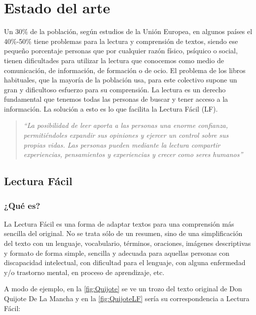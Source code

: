 \chapter{Estado del arte}
\label{cap:estadoDeLaCuestion}

Un 30\% de la población, según estudios de la Unión Europea, en algunos países el 40\%-50\% tiene problemas para la lectura y comprensión de textos, siendo ese pequeño porcentaje personas que por cualquier razón físico, psíquico o social, tienen dificultades para utilizar la lectura que conocemos como medio de comunicación, de información, de formación o de ocio. El problema de los libros habituales, que la mayoría de la población usa, para este colectivo supone un gran y dificultoso esfuerzo para su comprensión. La lectura es un derecho fundamental que tenemos todas las personas de buscar y tener acceso a la información. La solución a esto es lo que facilita la Lectura Fácil (LF).
\begin{quote}
	
\textit{“La posibilidad de leer aporta a las personas una enorme confianza, permitiéndoles expandir sus opiniones y ejercer un control sobre sus propias vidas. Las personas pueden mediante la lectura compartir experiencias, pensamientos y experiencias y crecer como seres humanos” \cite{Directrices de la IFLA}} 

	
\end{quote}



\section{Lectura Fácil}

\subsection{¿Qué es?}
La Lectura Fácil es una forma de adaptar textos para una comprensión más sencilla del original. No se trata sólo de un resumen, sino de una simplificación del texto con un lenguaje, vocabulario, términos, oraciones, imágenes descriptivas y formato de forma simple, sencilla y adecuada para aquellas personas con discapacidad intelectual, con dificultad para el lenguaje, con alguna enfermedad y/o trastorno mental, en proceso de aprendizaje, etc.

A modo de ejemplo, en la \ref{fig:Quijote} se ve un trozo del texto original de Don Quijote De La Mancha y en la \ref{fig:QuijoteLF} sería su correspondencia a Lectura Fácil:


